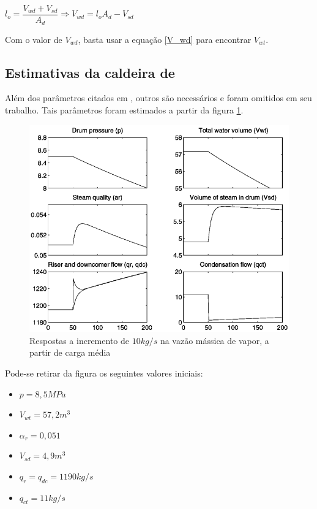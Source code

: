 \begin{center}
  $l_o = \dfrac{V_{wd} + V_{sd}}{A_d} \Rightarrow V_{wd} = l_o  A_d -
  V_{sd}$
\end{center}

Com o valor de $V_{wd}$, basta usar a equação \ref{V_wd} para
encontrar $V_{wt}$.



\subsection{Estimativas da caldeira de }

Além dos parâmetros citados em , outros são
necessários e foram omitidos em seu trabalho. Tais parâmetros foram
estimados a partir da figura \ref{plots_astrom_step_10kg_qs}.

\begin{figure}[H]
  \caption{\label{plots_astrom_step_10kg_qs} Respostas a incremento de
  $10 kg/s$ na vazão mássica de vapor, a partir de carga média}
  \begin{center}
    \includegraphics[scale=0.45]{img/plots_astrom_step_q_s_10kg.png}
  \end{center}
\end{figure}

Pode-se retirar da figura os seguintes valores iniciais:
\begin{itemize}
\item $ p = 8,5 MPa $
\item $ V_{wt} = 57,2 m^3 $
\item $ \alpha_r = 0,051 $
\item $ V_{sd} = 4,9 m^3 $
\item $ q_r = q_{dc} = 1190 kg/s $
\item $ q_{ct} = 11 kg/s $
\end{itemize}


